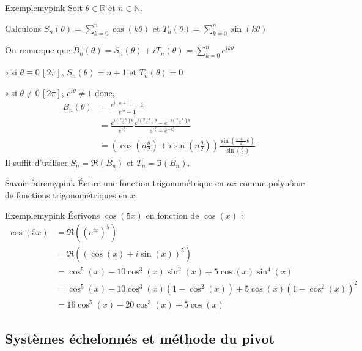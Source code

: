     \begin{omed}{Exemple}{mypink}
        Soit $\theta \in \mathbb{R}$ et $n \in \mathbb{N}$.
    
        Calculons $S_n (\theta) = \sum\limits_{k=0}^n \cos(k\theta)$ et $T_n(\theta) = \sum\limits_{k=0}^n \sin(k\theta)$
    
        On remarque que $B_n (\theta) = S_n (\theta) + i T_n(\theta) = \sum\limits_{k=0}^n e^{ik\theta}$
    
        $\circ$ si $\theta \equiv 0 \, [2\pi]$, $S_n(\theta) = n+1$ et $T_n(\theta) = 0$
    
        $\circ$ si $\theta \not\equiv 0 \, [2 \pi]$, $e^{i\theta} \neq 1$ donc,
    \begin{align*}
        B_n(\theta) &= \frac{e^{i(n+1)} -1}{e^{i\theta}-1} \\
        &= \frac{e^{i(\frac{n+1}{2})\theta}}{e^{i\frac{\theta}{2}}} \frac{e^{i(\frac{n+1}{2})\theta} - e^{-i(\frac{n+1}{2})\theta}}{e^{i\frac{\theta}{2}} - e^{-i\frac{\theta}{2}}} \\
        &= \left(\cos \left(n\frac{\theta}{2}\right) + i\sin \left(n\frac{\theta}{2}\right)\right)\frac{\sin(\frac{n+1}{2}\theta)}{\sin(\frac{\theta}{2})}
    \end{align*}
    Il suffit d’utiliser $S_n = \Re(B_n)$ et $T_n = \Im(B_n)$.
    \end{omed}

    \begin{omed}{Savoir-faire}{mypink}
        Écrire une fonction trigonométrique en $nx$ comme polynôme de fonctions trigonométriques en $x$.
    \end{omed}
        
    \begin{omed}{Exemple}{mypink}
        Écrivons $\cos(5x)$ en fonction de $\cos(x)$ :
        \begin{align*}
            \cos(5x) &= \Re\left((e^{ix})^5\right) \\
            &= \Re \left((\cos(x) + i\sin(x))^5\right) \\
            &= \cos^5(x) - 10\cos^3(x)\sin^2(x) + 5 \cos(x) \sin^4(x) \\
            &= \cos^5(x) - 10\cos^3(x) (1-\cos^2(x)) + 5 \cos(x) (1 - \cos^2(x))^2 \\
            &= 16 \cos^5(x) - 20 \cos^3(x) + 5 \cos(x)
        \end{align*}
    \end{omed}

\subsection{Systèmes échelonnés et méthode du pivot}

